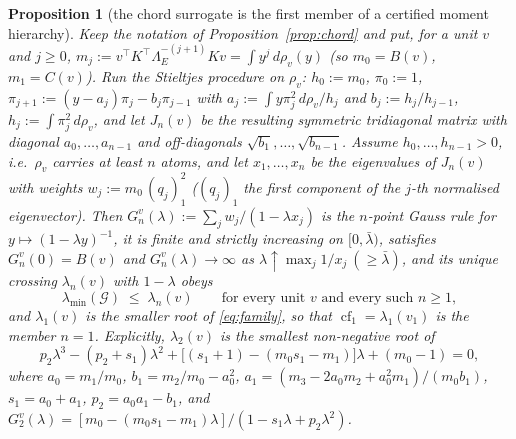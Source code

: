 \documentclass[11pt]{article}
\newtheorem{proposition}[theorem]{Proposition}
\theoremstyle{remark}
\newcommand{\Gr}{\mathcal{G}}
\newcommand{\Le}{\Lambda_E}
\begin{document}
\begin{proposition}[the chord surrogate is the first member of a certified moment hierarchy]
\label{prop:gauss}
Keep the notation of Proposition~\ref{prop:chord} and put, for a unit $v$ and $j\ge0$,
$m_j:=v^{\top}K^{\top}\Le^{-(j+1)}Kv=\int y^{j}\,d\rho_v(y)$ (so $m_0=B(v)$, $m_1=C(v)$).
Run the Stieltjes procedure on $\rho_v$: $h_0:=m_0$, $\pi_0:=1$, $\pi_{j+1}:=(y-a_j)\pi_j-b_j\pi_{j-1}$
with $a_j:=\int y\pi_j^{2}\,d\rho_v/h_j$ and $b_j:=h_j/h_{j-1}$, $h_j:=\int\pi_j^{2}\,d\rho_v$, and let
$J_n(v)$ be the resulting symmetric tridiagonal matrix with diagonal $a_0,\ldots,a_{n-1}$ and
off-diagonals $\sqrt{b_1},\ldots,\sqrt{b_{n-1}}$. Assume $h_0,\ldots,h_{n-1}>0$, \emph{i.e.}\
$\rho_v$ carries at least $n$ atoms, and let $x_1,\ldots,x_n$ be the eigenvalues of $J_n(v)$ with
weights $w_j:=m_0\,(q_j)_1^{2}$ ($(q_j)_1$ the first component of the $j$-th normalised eigenvector).
Then $G_n^v(\lambda):=\sum_j w_j/(1-\lambda x_j)$ is the $n$-point Gauss rule for
$y\mapsto(1-\lambda y)^{-1}$, it is finite and strictly increasing on $[0,\bar\lambda)$, satisfies
$G_n^v(0)=B(v)$ and $G_n^v(\lambda)\to\infty$ as $\lambda\uparrow\max_j 1/x_j\ (\ge\bar\lambda)$, and
its unique crossing $\lambda_n(v)$ with $1-\lambda$ obeys
\begin{equation}\label{eq:hier}
  \lambda_{\min}(\Gr)\;\le\;\lambda_n(v)\qquad
  \text{for every unit }v\text{ and every such }n\ge1,
\end{equation}
and $\lambda_1(v)$ is the smaller root of \eqref{eq:family}, so that
$\operatorname{cf}_1=\lambda_1(v_1)$ is the member $n=1$.
Explicitly, $\lambda_2(v)$ is the smallest non-negative root of
\begin{equation}\label{eq:cubic}
  p_2\lambda^{3}-(p_2+s_1)\lambda^{2}+\bigl[(s_1+1)-(m_0s_1-m_1)\bigr]\lambda+(m_0-1)=0,
\end{equation}
where $a_0=m_1/m_0$, $b_1=m_2/m_0-a_0^{2}$, $a_1=(m_3-2a_0m_2+a_0^{2}m_1)/(m_0b_1)$,
$s_1=a_0+a_1$, $p_2=a_0a_1-b_1$, and $G_2^v(\lambda)=[m_0-(m_0s_1-m_1)\lambda]/(1-s_1\lambda+p_2\lambda^{2})$.
\end{proposition}
\end{document}

